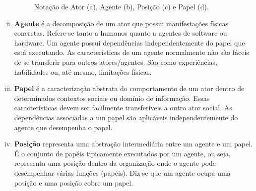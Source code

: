 \begin{enumerate}[i.]
                    \begin{figure}[h!]
                        \centering
                            \caption{Notação de Ator (a), Agente (b), Posição (c) e Papel (d).}
                            \label{fig:atores}
                    \end{figure}
                    
                    \item \textbf{Agente} é a decomposição de um ator que possui manifestações físicas concretas. Refere-se tanto a humanos quanto a agentes de software ou hardware. Um agente possui dependências independentemente do papel que está executando. As características de um agente normalmente não são fáceis de se transferir para outros atores/agentes. São como experiências, habilidades ou, até mesmo, limitações físicas.
                    \item \textbf{Papel} é a caracterização abstrata do comportamento de um ator dentro de determinados contextos sociais ou domínio de informação. Essas características devem ser facilmente transferíveis a outro ator social. As dependências associadas a um papel são aplicáveis independentemente do agente que desempenha o papel.
                    \item \textbf{Posição} representa uma abstração intermediária entre um agente e um papel. É o conjunto de papéis tipicamente executados por um agente, ou seja, representa uma posição dentro da organização onde o agente pode desempenhar várias funções (papéis). Diz-se que um agente ocupa uma posição e uma posição cobre um papel.
                \end{enumerate}

